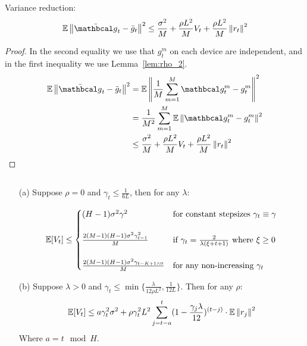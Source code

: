 \begin{lemma} \label{lem:var_red}
    Variance reduction:
    \begin{align}
        \E \norm{\bar{\mc{g}}_t - \bar{g}_t}^2 
        \leq 
        \frac{\sigma^2}{M} + \frac{\rho L^2 }{M} V_t  + \frac{\rho L^2 }{M} \norm{r_t}^2
    \end{align}
\end{lemma}
\begin{proof} In the second equality we use that $g^m_t$ on each device are independent, and in the first inequality we use Lemma~\ref{lem:rho_2}.
    \begin{align}
        \E \norm{\bar{\mc{g}}_t - \bar{g}_t}^2 
        &=
        \E \norm{\fsumm{m=1}{M}{\mc{g}^m_t - g^m_t}}^2 \\
        &=
        \frac{1}{M^2} \summ{m=1}{M} \E \norm{\mc{g}^m_t - g^m_t}^2 \\
        &\leq
        \frac{\sigma^2}{M} + \frac{\rho L^2 }{M} V_t  + \frac{\rho L^2 }{M} \norm{r_t}^2
    \end{align}
\end{proof}



\begin{lemma} \label{lem:lemma_Vt}

$\,$ 
    \begin{itemize}
        \item[(a)] Suppose $\rho = 0$ and $\gamma_{t} \leq \frac{1}{6L}$, then for any $\lambda$:

    \begin{align}
        \E [V_t] \leq
        \begin{cases}
            (H-1) \sigma^2 \gamma^2 & \text{for constant stepsizes } \gamma_t \equiv \gamma \\
            \\
            \frac{2 (M - 1) (H - 1) \sigma^2 \gamma_{t-1}^2}{M} & \text{if } \gamma_t = \frac{2}{\lambda(\xi + t + 1)} \text{ where } \xi \geq 0
            \\
            \\
            \frac{2 (M-1) (H-1) \sigma^2 \gamma_{t-K+1 \land 0}}{M} & \text{for any non-increasing } \gamma_t
        \end{cases}
    \end{align}


    \item[(b)] Suppose $\lambda > 0$ and $\gamma_{t} \leq \min \{ \frac{\lambda}{12\rho L^2}, \frac{1}{12L} \}$. Then for any $\rho$:
    \begin{align}
        \E [V_t]
        \leq
        a \gamma_{t}^2 \sigma^2 +
        \rho \gamma_{t}^2 L^2 \summ{j=t-a}{t}
        (1 - \frac{\gamma_{j} \lambda} {12})^{(t-j)}
        \cdot \E \norm{r_j}^2
    \end{align}
    Where $a = t \mod H$.
    \end{itemize}

    

\end{lemma}

